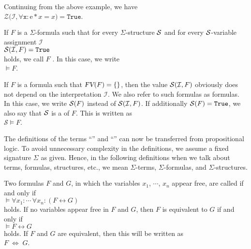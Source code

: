 \exampleEng
Continuing from the above example, we have \\[0.2cm]
\hspace*{1.3cm}  $\mathcal{Z}\bigl(\mathcal{I}, \forall \mathtt{x}: \mathrm{e} * x = x \bigr) = \mathtt{True}$.
\eox

\begin{Definition} 
    If $F$ is a $\Sigma$-formula such that for every $\Sigma$-structure $\mathcal{S}$ and for every
    $\mathcal{S}$-variable assignment $\mathcal{I}$ \\[0.2cm]
    \hspace*{1.3cm} $\mathcal{S}(\mathcal{I}, F) = \mathtt{True}$ \\[0.2cm]
    holds, we call $F$ . In this case, we write \\[0.2cm]
    \hspace*{1.3cm} $\models F$. 
    \eox
\end{Definition}

If $F$ is a formula such that $\textsl{FV}(F) = \{\}$, then the value $\mathcal{S}(\mathcal{I}, F)$ 
obviously does not depend on the interpretation $\mathcal{I}$. We also refer to such formulas as 
 formulas. In this case, we write $\mathcal{S}(F)$
instead of $\mathcal{S}(\mathcal{I}, F)$. If additionally $\mathcal{S}(F) = \mathtt{True}$, 
we also say that $\mathcal{S}$ is a   of $F$.
This is written as \\[0.2cm]
\hspace*{1.3cm} $\mathcal{S} \models F$. 
\vspace{0.1cm}

The definitions of the terms ``'' and
``'' can now be transferred from propositional logic. 
To avoid unnecessary complexity in the definitions, we assume a
fixed signature $\Sigma$ as given. Hence, in the following definitions
when we talk about terms, formulas, structures, etc., we mean $\Sigma$-terms,
$\Sigma$-formulas, and $\Sigma$-structures.

\begin{Definition}[Equivalent] 
  Two formulas $F$ and $G$, in which the variables $x_1$, $\cdots$, $x_n$ appear free, are called
   if and only if  
  \\[0.2cm] 
  \hspace*{1.3cm}
  $\models \forall x_1: \cdots\, \forall x_n: (F \leftrightarrow G)$
  \\[0.2cm] 
  holds. If no variables appear free in $F$ and $G$, then $F$ is equivalent to $G$ if and only if
  \\[0.2cm]
  \hspace*{1.3cm}
  $\models F \leftrightarrow G$
  \\[0.2cm]
  holds.  If $F$ and $G$ are equivalent, then this will be written as
  \\[0.2cm]
  \hspace*{1.3cm}
  $F \;\Leftrightarrow\; G$.
  \eox
\end{Definition}

